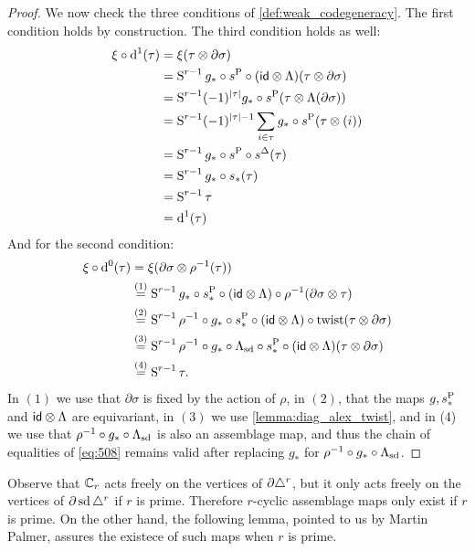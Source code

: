 \begin{proof}
We now check the three conditions of \cref{def:weak_codegeneracy}. The first condition holds by construction. The third condition holds as well:
\begin{equation}\label{eq:508}
\begin{split}
	\xi\circ \operatorname{d}^1(\tau) &= \xi(\tau\otimes \partial\sigma) \\
	&= \operatorname{S}^{r-1} g_*\circ s^{{\operatorname{P}}} \circ (\mathsf{id} \otimes \Lambda) (\tau\otimes \partial \sigma) \\
	&= \operatorname{S}^{r-1}(-1)^{|\tau|} g_*\circ s^{{\operatorname{P}}} (\tau\otimes \Lambda(\partial \sigma)) \\
	&= \operatorname{S}^{r-1}(-1)^{|\tau|-1}\sum_{i\in \tau} g_*\circ s^{{\operatorname{P}}} (\tau\otimes (i)) \\
	&= \operatorname{S}^{r-1} g_*\circ s^{{\operatorname{P}}} \circ s^{\Delta} (\tau) \\
	&= \operatorname{S}^{r-1} g_*\circ s_*(\tau) \\
	&= \operatorname{S}^{r-1} \tau \\
	&= \operatorname{d}^1(\tau)
\end{split}
\end{equation}
	And for the second condition:
	\begin{align*}
		\xi\circ \operatorname{d}^0(\tau) &= \xi(\partial\sigma \otimes \rho^{-1}(\tau))
		\\
		&\overset{(1)}= \operatorname{S}^{r-1}g_*\circ s_*^{{\operatorname{P}}}\circ (\mathsf{id}\otimes \Lambda)\circ \rho^{-1}(\partial\sigma \otimes \tau)
		\\
		&\overset{(2)}{=} \operatorname{S}^{r-1}\rho^{-1}\circ g_*\circ s_*^{{\operatorname{P}}}\circ (\mathsf{id}\otimes \Lambda)\circ \operatorname{twist}(  \tau \otimes \partial\sigma)
		\\
		&\overset{(3)}{=} \operatorname{S}^{r-1}\rho^{-1}\circ g_*\circ \Lambda_{\operatorname{sd}}\circ s_*^{{\operatorname{P}}}\circ (\mathsf{id}\otimes \Lambda)(\tau \otimes \partial\sigma)
		\\
		&\overset{(4)}{=} \operatorname{S}^{r-1}\tau.
	\end{align*}
In $(1)$ we use that $\partial\sigma$ is fixed by the action of $\rho$, in $(2)$, that the maps $g,s_*^{{\operatorname{P}}}$ and $\mathsf{id}\otimes \Lambda$ are equivariant, in $(3)$ we use \cref{lemma:diag_alex_twist}, and in (4) we use that $\rho^{-1}\circ g_*\circ \Lambda_{\operatorname{sd}}$ is also an assemblage map, and thus the chain of equalities of \eqref{eq:508} remains valid after replacing $g_*$ for $\rho^{-1}\circ g_*\circ \Lambda_{\operatorname{sd}}$.
\end{proof}


Observe that $\mathbb{C}_r$ acts freely on the vertices of $\partial \triangle^{r}$, but it only acts freely on the vertices of $\partial \operatorname{sd}\triangle^{r}$ if $r$ is prime. Therefore $r$-cyclic assemblage maps only exist if $r$ is prime. On the other hand, the following lemma, pointed to us by Martin Palmer, assures the existece of such maps when $r$ is prime. %



